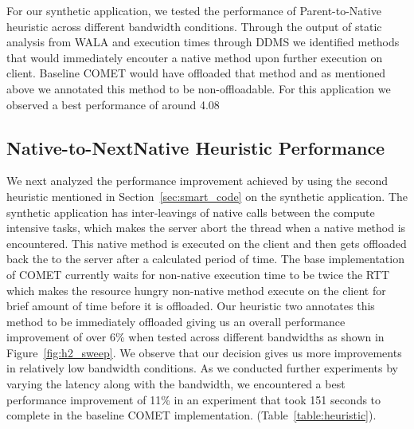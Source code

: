 For our synthetic application, we tested the performance of Parent-to-Native heuristic across different bandwidth conditions. Through the output of static analysis from WALA and execution times through DDMS we identified methods that would immediately encouter a native method upon further execution on client. Baseline COMET would have offloaded that method and as mentioned above we annotated this method to be non-offloadable. For this application we observed a best performance of around 4.08%

\subsection{Native-to-NextNative Heuristic Performance}
We next analyzed the performance improvement achieved by using the second heuristic mentioned in Section~\ref{sec:smart_code} on the synthetic application. The synthetic application has inter-leavings of native calls between the compute intensive tasks, which makes the server abort the thread when a native method is encountered. This native method is executed on the client and then gets offloaded back the to the server after a calculated period of time. The base implementation of COMET currently waits for non-native execution time to be twice the RTT which makes the resource hungry non-native method execute on the client for brief amount of time before it is offloaded. Our heuristic two annotates this method to be immediately offloaded giving us an overall performance improvement of over 6\% when tested across different bandwidths as shown in Figure~\ref{fig:h2_sweep}. We observe that our decision gives us more improvements in relatively low bandwidth conditions. As we conducted further experiments by varying the latency along with the bandwidth, we encountered a best performance improvement of 11\% in an experiment that took 151 seconds to complete in the baseline COMET implementation. (Table~\ref{table:heuristic}).

